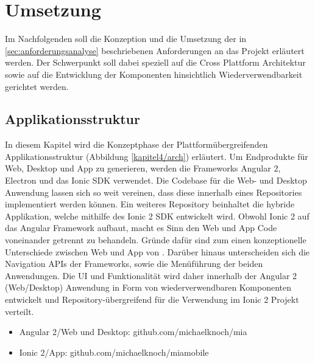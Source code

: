 
\chapter{Umsetzung}
\label{chap:umsetzung}

Im Nachfolgenden soll die Konzeption und die Umsetzung der in \ref{sec:anforderungsanalyse}
beschriebenen Anforderungen an das Projekt \projectname{} erläutert werden.
Der Schwerpunkt soll dabei speziell auf die Cross Plattform Architektur sowie auf die
Entwicklung der Komponenten hinsichtlich Wiederverwendbarkeit gerichtet werden.


\section{Applikationsstruktur}

In diesem Kapitel wird die Konzeptphase der Plattformübergreifenden Applikationsstruktur
(Abbildung \ref{kapitel4/arch}) erläutert.
Um Endprodukte für Web, Desktop und App zu generieren, werden die Frameworks Angular 2, Electron und das
Ionic \ac{SDK} verwendet. Die Codebase für die Web- und Desktop Anwendung lassen sich so weit vereinen,
dass diese innerhalb eines Repositories implementiert werden können.
Ein weiteres Repository beinhaltet die hybride Applikation,
welche mithilfe des Ionic 2 \ac{SDK} entwickelt wird. Obwohl Ionic 2 auf das Angular Framework aufbaut,
macht es Sinn den Web und App Code voneinander getrennt zu behandeln.
Gründe dafür sind zum einen konzeptionelle Unterschiede zwischen Web und App von \projectname{}.
Darüber hinaus unterscheiden sich die Navigation APIs der Frameworks, sowie die Menüführung der beiden Anwendungen.
Die \ac{UI} und Funktionalität wird daher innerhalb der Angular 2 (Web/Desktop)
Anwendung in Form von wiederverwendbaren Komponenten entwickelt und
Repository-übergreifend für die Verwendung im Ionic 2 Projekt verteilt.

\begin{itemize}
  \item Angular 2/Web und Desktop: github.com/michaelknoch/mia
  \item Ionic 2/App: github.com/michaelknoch/miamobile
\end{itemize}



